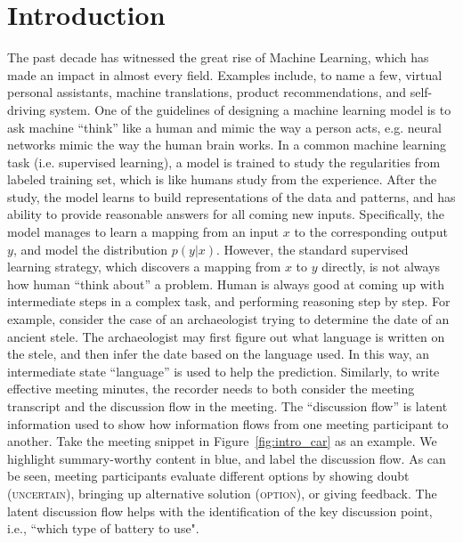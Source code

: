 \chapter{Introduction} \label{sec:ch-1}

The past decade has witnessed the great rise of Machine Learning, which has made an impact in almost every field. Examples include, to name a few, virtual personal assistants, machine translations, product recommendations, and self-driving system. One of the guidelines of designing a machine learning model is to ask machine ``think'' like a human and mimic the way a person acts, e.g. neural networks mimic the way the human brain works. In a common machine learning task (i.e. supervised learning), a model is trained to study the regularities from labeled training set, which is like humans study from the experience. After the study, the model learns to build representations of the data and patterns, and has ability to provide reasonable answers for all coming new inputs. Specifically, the model manages to learn a mapping from an input $x$ to the corresponding output $y$, and model the distribution $p(y|x)$. However, the standard supervised learning strategy, which discovers a mapping from $x$ to $y$ directly, is not always how human ``think about'' a problem. Human is always good at coming up with intermediate steps in a complex task, and performing reasoning step by step. For example, consider the case of an archaeologist trying to determine the date of an ancient stele. The archaeologist may first figure out what language is written on the stele, and then infer the date based on the language used. In this way, an intermediate state ``language'' is used to help the prediction. Similarly, to write effective meeting minutes, the recorder needs to both consider the meeting transcript and the discussion flow in the meeting. The ``discussion flow'' is latent information used to show how information flows from one meeting participant to another. Take the meeting snippet in Figure~\ref{fig:intro_car} as an example. We highlight summary-worthy content in blue, and label the discussion flow. As can be seen, meeting participants evaluate different options by showing doubt (\textsc{uncertain}), bringing up alternative solution (\textsc{option}), or giving feedback. The latent discussion flow helps with the identification of the key discussion point, i.e., ``which type of battery to use".

